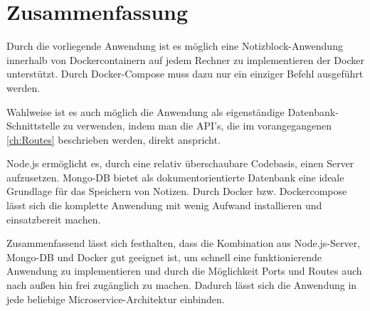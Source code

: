 
\chapter{Zusammenfassung}
\label{ch:Zusammenfassung}
Durch die vorliegende Anwendung ist es möglich eine Notizblock-Anwendung innerhalb von Dockercontainern auf jedem Rechner zu implementieren der Docker unterstützt.
Durch Docker-Compose muss dazu nur ein einziger Befehl ausgeführt werden.

Wahlweise ist es auch möglich die Anwendung als eigenständige Datenbank-Schnittstelle zu verwenden, indem man die \acs{API}'s, die im vorangegangenen \autoref{ch:Routes} beschrieben werden, direkt anspricht.

Node.js ermöglicht es, durch eine relativ überschaubare Codebasis, einen Server aufzusetzen.
Mongo-DB bietet als dokumentorientierte Datenbank eine ideale Grundlage für das Speichern von Notizen.
Durch Docker bzw. Dockercompose lässt sich die komplette Anwendung mit wenig Aufwand installieren und einsatzbereit machen.

Zusammenfassend lässt sich festhalten, dass die Kombination aus Node.js-Server, Mongo-DB und Docker gut geeignet ist, um schnell eine funktionierende Anwendung zu implementieren und durch die Möglichkeit Ports und Routes auch nach außen hin frei zugänglich zu machen. Dadurch lässt sich die Anwendung in jede beliebige Microservice-Architektur einbinden. 